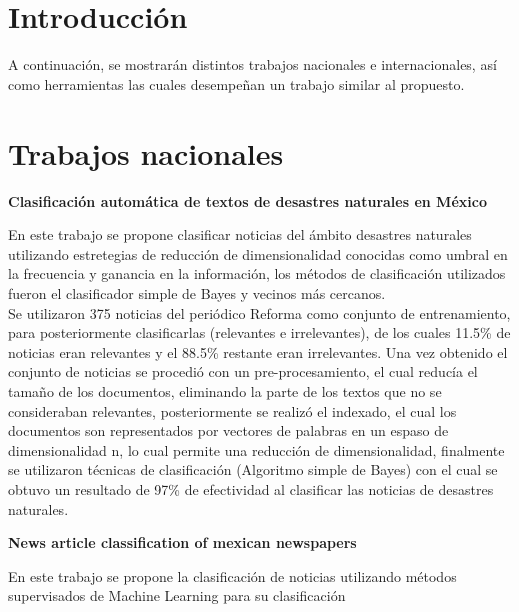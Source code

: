 
\ \\\\
\section{Introducción}

A continuación, se mostrarán distintos trabajos nacionales e internacionales, así como herramientas las cuales desempeñan un trabajo similar al propuesto.

\section{Trabajos nacionales}

\begin{large}
	 \textbf{Clasificación automática de textos de desastres naturales en México}\\
\end{large}

En este trabajo se propone clasificar noticias del ámbito desastres naturales utilizando estretegias de reducción de dimensionalidad conocidas como umbral en la frecuencia y ganancia en la información, los métodos de clasificación utilizados fueron el clasificador simple de Bayes y vecinos más cercanos.\\

Se utilizaron 375 noticias del periódico Reforma como conjunto de entrenamiento, para posteriormente clasificarlas (relevantes e irrelevantes), de los cuales 11.5\% de noticias eran relevantes y el 88.5\% restante eran irrelevantes. Una vez obtenido el conjunto de noticias se procedió con un pre-procesamiento, el cual reducía el tamaño de los documentos, eliminando la parte de los textos que no se consideraban relevantes, posteriormente se realizó el indexado, el cual los documentos son representados por vectores de palabras en un espaso de dimensionalidad n, lo cual permite una reducción de dimensionalidad, finalmente se utilizaron técnicas de clasificación (Algoritmo simple de Bayes) con el cual se obtuvo un resultado de 97\% de efectividad al clasificar las noticias de desastres naturales\cite{cuatro}.\\

\begin{large}
	 \textbf{News article classification of mexican newspapers}\\
\end{large}

En este trabajo se propone la clasificación de noticias utilizando métodos supervisados de Machine Learning para su clasificación

